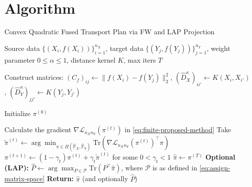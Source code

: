\documentclass{article}
\begin{document}
\section{Algorithm}\label{sec:Algorithm}
\begin{algorithm}[t]
	\caption{Convex Quadratic Fused Transport Plan via FW and LAP Projection}
	\label{alg:proposed-algorithm}
	\begin{algorithmic}[1]
		\Require Source data $\{(X_i, f(X_i))\}_{i=1}^{n_X}$, target data $\{(Y_j, f(Y_j))\}_{j=1}^{n_Y}$, weight parameter $0 \leq \alpha \leq 1$, distance kernel $K$, max iters $T$
		
		\State Construct matrices:
		\Statex \hspace{\algorithmicindent} $(C_f)_{ij} \gets \|f(X_i)-f(Y_j)\|_2^2$, \quad
		$(\hat{D}_X^{\kappa})_{ii'} \gets K(X_i,X_{i'})$, \quad
		$(\hat{D}_Y^{\kappa})_{jj'} \gets K(Y_j,Y_{j'})$
		
		\State Initialize $\pi^{(0)}$
		
		\State Calculate the gradient $\nabla \mathcal{L}_{n_Xn_Y}(\pi^{(t)})$ in \eqref{eq:finite-proposed-method}
		\State Take $\tilde{\pi}^{(t)} \gets \arg\min_{\pi \in \Pi(\hat{\mathbb{P}}_X,\hat{\mathbb{P}}_Y)} \mathrm{Tr}(\nabla \mathcal{L}_{n_Xn_Y}(\pi^{(t)})^\top \pi)$
		\State $\pi^{(t+1)} \gets (1-\gamma_t)\pi^{(t)} + \gamma_t \tilde{\pi}^{(t)}$ for some $0 < \gamma_t < 1$
		\EndFor
		\State $\hat\pi \gets \pi^{(T)}$
		\State \textbf{Optional (LAP):} $\displaystyle
		\hat P \gets \arg\max_{P \in \mathcal{P}} \mathrm{Tr}(P^\top \hat\pi)$, where $\mathcal{P}$ is as defined in \eqref{eq:assign-matrix-space}
		\State \textbf{Return:} $\hat\pi$ (and optionally $\hat{P}$)
	\end{algorithmic}
\end{algorithm}
\end{document}

